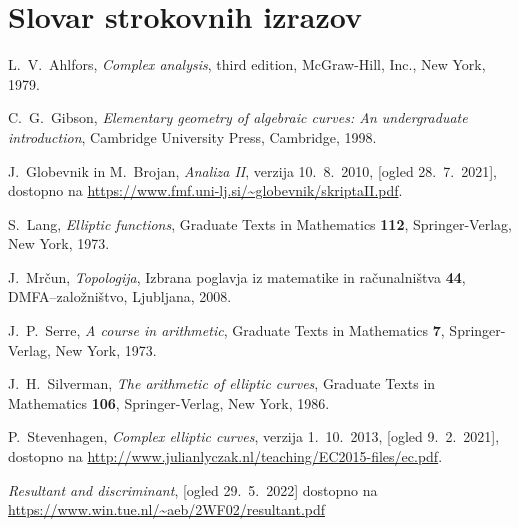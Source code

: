 \documentclass[mat1]{fmfdelo}
\numberwithin{equation}{section}
\theoremstyle{definition}
\begin{document}
\section*{Slovar strokovnih izrazov}



\begin{thebibliography}{99}
    
        L.~V.~Ahlfors, \emph{Complex analysis}, third edition, McGraw-Hill, Inc., New York, 1979.

        C.~G.~Gibson, \emph{Elementary geometry of algebraic curves: An undergraduate introduction}, Cambridge University Press, Cambridge, 1998.

        J.~Globevnik in M.~Brojan, \emph{Analiza II}, verzija 10.~8.~2010, [ogled 28.~7.~2021], dostopno na \url{https://www.fmf.uni-lj.si/~globevnik/skriptaII.pdf}.
    
        S.~Lang, \emph{Elliptic functions}, Graduate Texts in Mathematics \textbf{112}, Springer-Verlag, New York, 1973.

        J.~Mrčun, \emph{Topologija}, Izbrana poglavja iz matematike in računalništva \textbf{44}, DMFA--založništvo, Ljubljana, 2008.
    
        J.~P.~Serre, \emph{A course in arithmetic}, Graduate Texts in Mathematics \textbf{7}, Springer-Verlag, New York, 1973.

        J.~H.~Silverman, \emph{The arithmetic of elliptic curves}, Graduate Texts in Mathematics \textbf{106}, Springer-Verlag, New York, 1986.

        P.~Stevenhagen, \emph{Complex elliptic curves}, verzija 1.~10.~2013, [ogled 9.~2.~2021], dostopno na \url{http://www.julianlyczak.nl/teaching/EC2015-files/ec.pdf}.

        \emph{Resultant and discriminant}, [ogled 29.~5.~2022] dostopno na \url{https://www.win.tue.nl/~aeb/2WF02/resultant.pdf}
    
\end{thebibliography}
\end{document}
